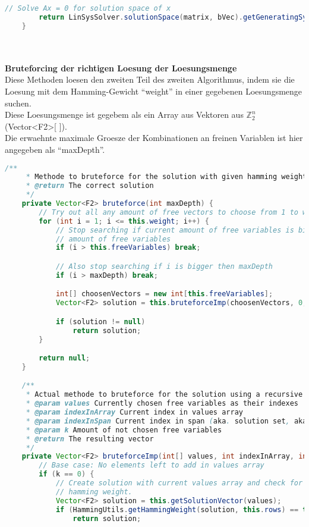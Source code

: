 \documentclass[a4paper,10pt,ngerman]{scrartcl}
\begin{document}
{\begin{lstlisting}[language=Java]
        // Solve Ax = 0 for solution space of x
        return LinSysSolver.solutionSpace(matrix, bVec).getGeneratingSystem();
    }
\end{lstlisting}
\\
\\
\textbf{Bruteforcing der richtigen Loesung der Loesungsmenge} \\
Diese Methoden loesen den zweiten Teil des zweiten Algorithmus, indem sie die Loesung mit dem Hamming-Gewicht "`weight"' in einer gegebenen Loesungsmenge suchen.\\
Diese Loesungsmenge ist gegebem als ein Array aus Vektoren aus \(\mathbb{Z}_{2}^n\) (Vector<F2>[ ]). \\
Die erwaehnte maximale Groesze der Kombinationen an freinen Variablen ist hier angegeben als "`maxDepth"'.\\
\begin{lstlisting}[language=Java]
		/**
     * Methode to bruteforce for the solution with given hamming weight
     * @return The correct solution
     */
    private Vector<F2> bruteforce(int maxDepth) {
        // Try out all any amount of free vectors to choose from 1 to weight (inclusive)
        for (int i = 1; i <= this.weight; i++) {
            // Stop searching if current amount of free variables is bigger then the
            // amount of free variables
            if (i > this.freeVariables) break;

            // Also stop searching if i is bigger then maxDepth
            if (i > maxDepth) break;

            int[] choosenVectors = new int[this.freeVariables];
            Vector<F2> solution = this.bruteforceImp(choosenVectors, 0, -1, i);

            if (solution != null)
                return solution;
        }

        return null;
    }

    /**
     * Actual methode to bruteforce for the solution using a recursive methode
     * @param values Currently chosen free variables as their indexes
     * @param indexInArray Current index in values array
     * @param indexInSpan Current index in span (aka. solution set, aka. free variables)
     * @param k Amount of not chosen free variables
     * @return The resulting vector
     */
    private Vector<F2> bruteforceImp(int[] values, int indexInArray, int indexInSpan, int k) {
        // Base case: No elements left to add in values array
        if (k == 0) {
            // Create solution with current values array and check for needed
            // hamming weight.
            Vector<F2> solution = this.getSolutionVector(values);
            if (HammingUtils.getHammingWeight(solution, this.rows) == this.weight)
                return solution;


\end{lstlisting}}
\end{document}
